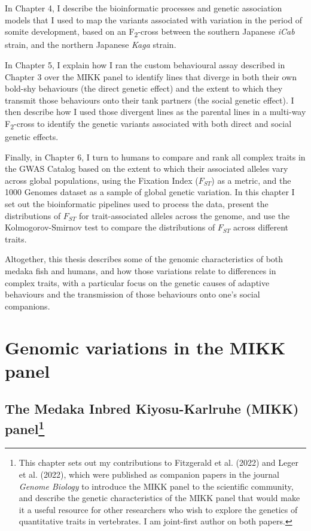 \documentclass[
]{book}
\begin{document}
In Chapter 4, I describe the bioinformatic processes and genetic association models that I used to map the variants associated with variation in the period of somite development, based on an F\textsubscript{2}-cross between the southern Japanese \emph{iCab} strain, and the northern Japanese \emph{Kaga} strain.

In Chapter 5, I explain how I ran the custom behavioural assay described in Chapter 3 over the MIKK panel to identify lines that diverge in both their own bold-shy behaviours (the direct genetic effect) and the extent to which they transmit those behaviours onto their tank partners (the social genetic effect). I then describe how I used those divergent lines as the parental lines in a multi-way F\textsubscript{2}-cross to identify the genetic variants associated with both direct and social genetic effects.

Finally, in Chapter 6, I turn to humans to compare and rank all complex traits in the GWAS Catalog based on the extent to which their associated alleles vary across global populations, using the Fixation Index (\(F_{ST}\)) as a metric, and the 1000 Genomes dataset as a sample of global genetic variation. In this chapter I set out the bioinformatic pipelines used to process the data, present the distributions of \(F_{ST}\) for trait-associated alleles across the genome, and use the Kolmogorov-Smirnov test to compare the distributions of \(F_{ST}\) across different traits.

Altogether, this thesis describes some of the genomic characteristics of both medaka fish and humans, and how those variations relate to differences in complex traits, with a particular focus on the genetic causes of adaptive behaviours and the transmission of those behaviours onto one's social companions.

\hypertarget{MIKK-genomes-chap}{%
\chapter{Genomic variations in the MIKK panel}\label{MIKK-genomes-chap}}

\hypertarget{the-medaka-inbred-kiyosu-karlruhe-mikk-panel}{%
\section[The Medaka Inbred Kiyosu-Karlruhe (MIKK) panel]{\texorpdfstring{The Medaka Inbred Kiyosu-Karlruhe (MIKK) panel\footnote{This chapter sets out my contributions to Fitzgerald et al. (2022) and Leger et al. (2022), which were published as companion papers in the journal \emph{Genome Biology} to introduce the MIKK panel to the scientific community, and describe the genetic characteristics of the MIKK panel that would make it a useful resource for other researchers who wish to explore the genetics of quantitative traits in vertebrates. I am joint-first author on both papers.}}{The Medaka Inbred Kiyosu-Karlruhe (MIKK) panel}}\label{the-medaka-inbred-kiyosu-karlruhe-mikk-panel}}
\end{document}
